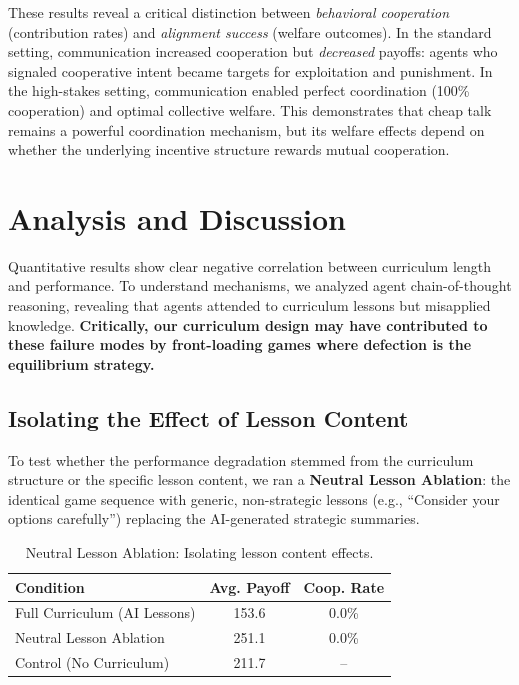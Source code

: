 \documentclass[11pt]{article}
\begin{document}
These results reveal a critical distinction between \textit{behavioral cooperation} (contribution rates) and \textit{alignment success} (welfare outcomes). In the standard setting, communication increased cooperation but \textit{decreased} payoffs: agents who signaled cooperative intent became targets for exploitation and punishment. In the high-stakes setting, communication enabled perfect coordination (100\% cooperation) and optimal collective welfare. This demonstrates that cheap talk remains a powerful coordination mechanism, but its welfare effects depend on whether the underlying incentive structure rewards mutual cooperation.


\section{Analysis and Discussion}

Quantitative results show clear negative correlation between curriculum length and performance. To understand mechanisms, we analyzed agent chain-of-thought reasoning, revealing that agents attended to curriculum lessons but misapplied knowledge. \textbf{Critically, our curriculum design may have contributed to these failure modes by front-loading games where defection is the equilibrium strategy.}

\subsection{Isolating the Effect of Lesson Content}
\label{sec:ablation}

To test whether the performance degradation stemmed from the curriculum structure or the specific lesson content, we ran a \textbf{Neutral Lesson Ablation}: the identical game sequence with generic, non-strategic lessons (e.g., ``Consider your options carefully'') replacing the AI-generated strategic summaries.

\begin{table}[h]
  \caption{Neutral Lesson Ablation: Isolating lesson content effects.}
  \label{tab:ablation}
  \centering
  \small
  \begin{tabular}{lcc}
    \toprule
    Condition & Avg. Payoff & Coop. Rate \\
    \midrule
    Full Curriculum (AI Lessons) & 153.6 & 0.0\% \\
    Neutral Lesson Ablation & 251.1 & 0.0\% \\
    Control (No Curriculum) & 211.7 & -- \\
    \bottomrule
  \end{tabular}
\end{table}
\end{document}
